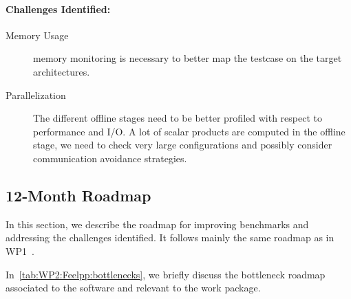 \paragraph{Challenges Identified:} 

\begin{description}
    \item[Memory Usage] memory monitoring is necessary to better map the testcase on the target architectures.
    \item[Parallelization] The different offline stages need to be better profiled with respect to performance and I/O. A lot of  scalar products are computed in the offline stage, we need to check very large configurations and possibly consider communication avoidance strategies.
\end{description}


\subsection{12-Month Roadmap}
\label{sec:WP2:Feelpp:roadmap}

In this section, we describe the roadmap for improving benchmarks and addressing the challenges identified. 
It follows mainly the same roadmap as in WP1~.

In~\cref{tab:WP2:Feelpp:bottlenecks}, we briefly discuss the bottleneck roadmap associated to the software and relevant to the work package.

